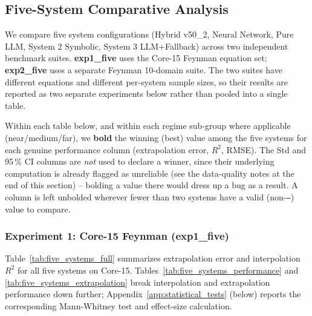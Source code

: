\subsection{Five-System Comparative Analysis}\label{subsec:fivesystem-comparative-analysis-feynman-}
\label{sec:five_systems}

We compare five system configurations (Hybrid v50\_2, Neural Network, Pure
LLM, System 2 Symbolic, System 3 LLM+Fallback) across two independent
benchmark suites. \textbf{exp1\_five} uses the Core-15 Feynman equation set;
\textbf{exp2\_five} uses a separate Feynman 10-domain suite. The two suites
have different equations and different per-system sample sizes, so their
results are reported as two separate experiments below rather than pooled
into a single table.

Within each table below, and within each regime sub-group where applicable
(near/medium/far), we \textbf{bold} the winning (best) value among the five
systems for each genuine performance column (extrapolation error, $R^2$,
RMSE). The Std and 95\,\% CI columns are \emph{not} used to declare a winner,
since their underlying computation is already flagged as unreliable (see the
data-quality notes at the end of this section) -- bolding a value there would
dress up a bug as a result. A column is left unbolded wherever fewer than two
systems have a valid (non-\texttt{---}) value to compare.

\subsubsection{Experiment 1: Core-15 Feynman (exp1\_five)}\label{subsubsec:five-system-exp1}

Table~\ref{tab:five_systems_full} summarizes extrapolation error
and interpolation $R^2$ for all five systems on Core-15. Tables~\ref{tab:five_systems_performance}
and \ref{tab:five_systems_extrapolation} break interpolation and extrapolation
performance down further; Appendix~\ref{app:statistical_tests} (below) reports
the corresponding Mann-Whitney test and effect-size calculation.

